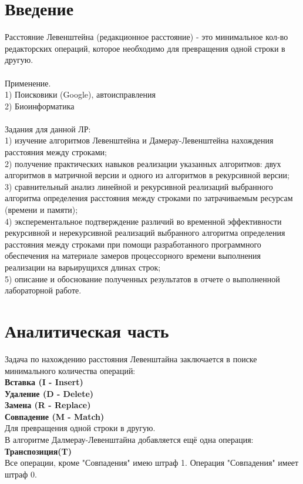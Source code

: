 \documentclass[12pt,a4paper]{article}
\begin{document}
\section*{\Huge Введение}
Расстояние Левенштейна (редакционное расстояние) - это минимальное кол-во редакторских операций, которое необходимо для превращения одной строки в другую.\\
\\
Применение.\\
1) Поисковики (Google), автоисправления\\
2) Биоинформатика\\
\\
Задания для данной ЛР:\\
1) изучение алгоритмов Левенштейна и Дамерау-Левенштейна нахождения расстояния между строками;\\
2) получение практических навыков реализации указанных алгоритмов: двух алгоритмов в матричной версии и одного из алгоритмов в рекурсивной версии;\\
3) сравнительный анализ линейной и рекурсивной реализаций выбранного алгоритма определения расстояния между строками по затрачиваемым ресурсам (времени и памяти);\\
4) эксперементальное подтверждение различий во временной эффективности рекурсивной и нерекурсивной реализаций выбранного алгоритма определения расстояния между строками при помощи разработанного программного обеспечения на материале замеров процессорного времени выполнения реализации на варьирущихся длинах строк;\\
5) описание и обоснование полученных результатов в отчете о выполненной лабораторной работе.\\
\clearpage

\section{Аналитическая часть}
Задача по нахождению расстояния Левенштайна заключается в поиске минимального количества операций:\\
\textbf{Вставка (I - Insert)}\\
\textbf{Удаление (D - Delete)}\\
\textbf{Замена (R - Replace)}\\
\textbf{Совпадение (M - Match)}\\
Для превращения одной строки в другую.\\
В алгоритме Далмерау-Левенштайна добавляется ещё одна операция:\\
\textbf{Транспозиция(T)}\\
Все операции, кроме "Совпадения" имею штраф 1. Операция "Совпадения" имеет штраф 0.
\newpage
\end{document}
